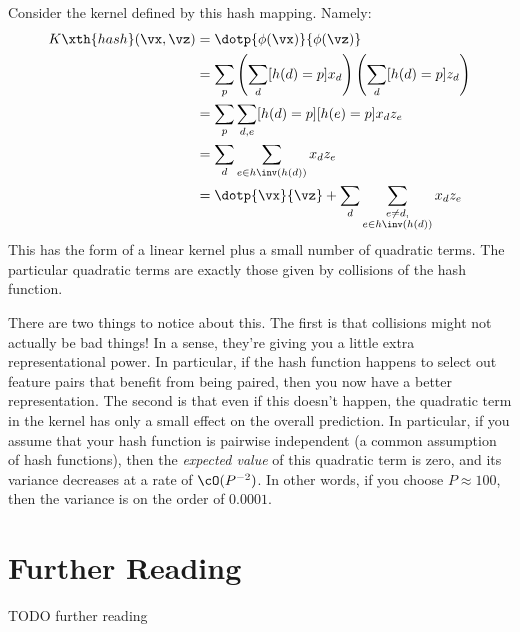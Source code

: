 Consider the kernel defined by this hash mapping.  Namely:
%
\begin{align}
  K\xth{hash}(\vx, \vz)
  &=
  \dotp{\phi(\vx)}{\phi(\vz)} \\
  &=
  \sum_p \left( \sum_d [h(d) = p] x_d \right) \left( \sum_d [h(d) = p] z_d \right)\\
  &=
  \sum_p \sum_{d,e} [h(d) = p] [h(e) = p] x_d z_e \\
  &=
  \sum_d \sum_{e \in h\inv(h(d))} x_d z_e \\
  &=
  \dotp{\vx}{\vz} + \sum_d \sum_{\substack{e \neq d,\\e \in h\inv(h(d))}} x_d z_e
\end{align}
%
This  has the form of a linear kernel plus a
small number of quadratic terms.  The particular quadratic terms are
exactly those given by collisions of the hash function.

There are two things to notice about this.  The first is that
collisions might not actually be bad things!  In a sense, they're
giving you a little extra representational power.  In particular, if
the hash function happens to select out feature pairs that benefit
from being paired, then you now have a better representation.  The
second is that even if this doesn't happen, the quadratic term in the
kernel has only a small effect on the overall prediction.  In
particular, if you assume that your hash function is pairwise
independent (a common assumption of hash functions), then the
\emph{expected value} of this quadratic term is zero, and its variance
decreases at a rate of $\cO(P^{-2})$.  In other words, if you choose
$P \approx 100$, then the variance is on the order of $0.0001$.

\section{Further Reading}

TODO further reading


\begin{comment}
already know (sub)GD from loss.tex
talk about stochastic (sub)GD
formal optimization and duals
hashing tricks
sparsity
\end{comment}


